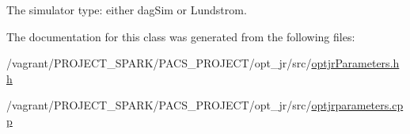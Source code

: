 The simulator type\-: either dag\-Sim or Lundstrom. 



The documentation for this class was generated from the following files\-:\begin{DoxyCompactItemize}
\item 
/vagrant/\-P\-R\-O\-J\-E\-C\-T\-\_\-\-S\-P\-A\-R\-K/\-P\-A\-C\-S\-\_\-\-P\-R\-O\-J\-E\-C\-T/opt\-\_\-jr/src/\hyperlink{optjrParameters_8hh}{optjr\-Parameters.\-hh}\item 
/vagrant/\-P\-R\-O\-J\-E\-C\-T\-\_\-\-S\-P\-A\-R\-K/\-P\-A\-C\-S\-\_\-\-P\-R\-O\-J\-E\-C\-T/opt\-\_\-jr/src/\hyperlink{optjrparameters_8cpp}{optjrparameters.\-cpp}\end{DoxyCompactItemize}
